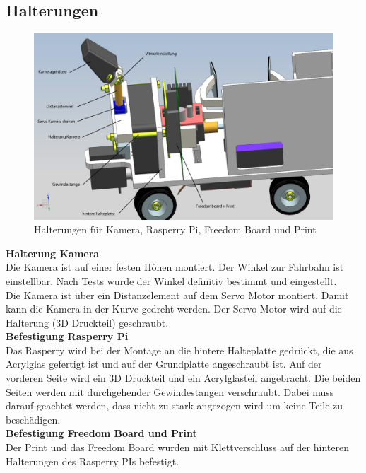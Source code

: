 \subsection{Halterungen}
\begin{figure}[H]
\centering
\includegraphics[width=1\textwidth]{03_Loesungskonzept/pictures/halterungen2.png}
\caption{Halterungen für Kamera, Rasperry Pi, Freedom Board und Print}
\end{figure}
\textbf{Halterung Kamera}\\[0.2cm]
Die Kamera ist auf einer festen Höhen montiert. Der Winkel zur Fahrbahn ist einstellbar. Nach Tests wurde der Winkel definitiv bestimmt und eingestellt.\\[0.2cm]
Die Kamera ist über ein Distanzelement auf dem Servo Motor montiert. Damit kann die Kamera in der Kurve gedreht werden. Der Servo Motor wird auf die Halterung (3D Druckteil) geschraubt.\\[0.2cm]
\textbf{Befestigung Rasperry Pi}\\[0.2cm]
Das Rasperry wird bei der Montage an die hintere Halteplatte gedrückt, die aus Acrylglas gefertigt ist und auf der Grundplatte angeschraubt ist. Auf der vorderen Seite wird ein 3D Druckteil und ein Acrylglasteil angebracht. Die beiden Seiten werden mit durchgehender Gewindestangen verschraubt. Dabei muss darauf geachtet werden, dass nicht zu stark angezogen wird um keine Teile zu beschädigen.\\[0.2cm]
\textbf{Befestigung Freedom Board und Print}\\[0.2cm]
Der Print und das Freedom Board wurden mit Klettverschluss auf der hinteren Halterungen des Rasperry PIs befestigt.\\[0.2cm]
